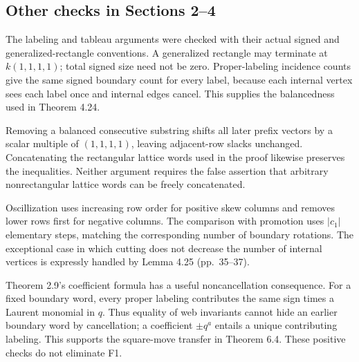 \documentclass[10pt]{article}
\begin{document}
\subsection*{Other checks in Sections 2–4}
The labeling and tableau arguments were checked with their actual signed and generalized-rectangle conventions. A generalized rectangle may terminate at \(k(1,1,1,1)\); total signed size need not be zero. Proper-labeling incidence counts give the same signed boundary count for every label, because each internal vertex sees each label once and internal edges cancel. This supplies the balancedness used in Theorem 4.24.\par
Removing a balanced consecutive substring shifts all later prefix vectors by a scalar multiple of \((1,1,1,1)\), leaving adjacent-row slacks unchanged. Concatenating the rectangular lattice words used in the proof likewise preserves the inequalities. Neither argument requires the false assertion that arbitrary nonrectangular lattice words can be freely concatenated.\par
Oscillization uses increasing row order for positive skew columns and removes lower rows first for negative columns. The comparison with promotion uses \(|c_1|\) elementary steps, matching the corresponding number of boundary rotations. The exceptional case in which cutting does not decrease the number of internal vertices is expressly handled by Lemma 4.25 (pp. 35–37).\par
Theorem 2.9’s coefficient formula has a useful noncancellation consequence. For a fixed boundary word, every proper labeling contributes the same sign times a Laurent monomial in \(q\). Thus equality of web invariants cannot hide an earlier boundary word by cancellation; a coefficient \(\pm q^a\) entails a unique contributing labeling. This supports the square-move transfer in Theorem 6.4. These positive checks do not eliminate F1.\par
\end{document}
